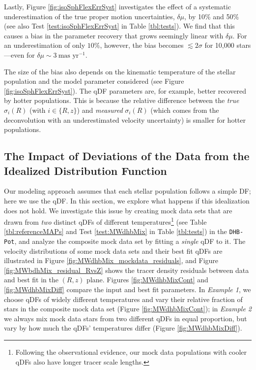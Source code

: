 \documentclass[iop,revtex4,numberedappendix,appendixfloats]{emulateapj}
\begin{document}
Lastly, Figure \ref{fig:isoSphFlexErrSyst} investigates the effect of a systematic underestimation of the true proper motion uncertainties, $\delta \mu$, by 10\% and 50\% (see also Test \ref{test:isoSphFlexErrSyst} in Table \ref{tbl:tests}). We find that this causes a bias in the parameter recovery that grows seemingly linear with $\delta \mu$. For an underestimation of only $10\%$, however, the bias becomes $\lesssim 2 \sigma$ for 10,000 stars---even for $\delta \mu \sim 3~\text{mas yr}^{-1}$.

The size of the bias also depends on the kinematic temperature of the stellar population and the model parameter considered (see Figure \ref{fig:isoSphFlexErrSyst}). The qDF parameters are, for example, better recovered by hotter populations. This is because the relative difference between the \emph{true} $\sigma_i(R)$ (with $i \in \{R,z\}$) and \emph{measured} $\sigma_i(R)$ (which comes from the deconvolution with an underestimated velocity uncertainty) is smaller for hotter populations. 

\subsection{The Impact of Deviations of the Data from the Idealized Distribution Function} \label{sec:results_mixedDFs}

Our modeling approach assumes that each stellar population follows a simple DF; here we use the qDF. In this section, we explore what happens if this idealization does not hold. We investigate this issue by creating mock data sets that are drawn from \emph{two} distinct qDFs of different temperatures\footnote{Following the observational evidence, our mock data populations with cooler qDFs also have longer tracer scale lengths.} (see Table \ref{tbl:referenceMAPs} and Test \ref{test:MWdhbMix} in Table \ref{tbl:tests}) in the \texttt{DHB-Pot}, and analyze the composite mock data set by fitting a \emph{single} qDF to it. The velocity distributions of some mock data sets and their best fit qDFs are illustrated in Figure \ref{fig:MWdhbMix_mockdata_residuals}, and Figure \ref{fig:MWbdhMix_residual_RvsZ} shows the tracer density residuals between data and best fit in the $(R,z)$ plane. Figures \ref{fig:MWdhbMixCont} and \ref{fig:MWdhbMixDiff} compare the input and best fit parameters. In \emph{Example 1}, we choose qDFs of widely different temperatures and vary their relative fraction of stars in the composite mock data set (Figure \ref{fig:MWdhbMixCont}); in \emph{Example 2} we always mix mock data stars from two different qDFs in equal proportion, but vary by how much the qDFs' temperatures differ (Figure \ref{fig:MWdhbMixDiff}). 
\end{document}
